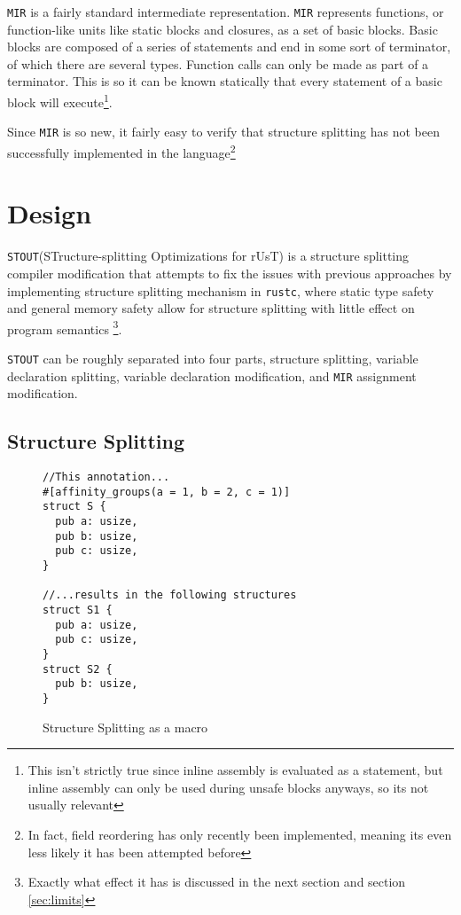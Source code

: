 \documentclass[12pt,oneside]{book}
\newcommand{\rustcname}{{\texttt{rustc}}}
\def \rustc {\rustcname{}\xspace}
\newcommand{\mirname}{{\texttt{MIR}}}
\def \mir {\mirname{}\xspace}
\newcommand{\projectname}{{\texttt{STOUT}}}
\def \name{\projectname\xspace}
\begin{document}
\mir is a fairly standard intermediate representation. \mir represents functions, 
or function-like units like static blocks and closures, 
as a set of basic blocks. Basic blocks are composed of a series of statements
and end in some sort of terminator, of which there are several types. 
Function calls can only be made as part of a terminator. This is
so it can be known statically that every statement of a basic block will
execute\footnote{This isn't strictly true since inline assembly is evaluated as
  a statement, but inline assembly can only be used during unsafe blocks
  anyways, so its not usually relevant}.

  Since \mir is so new, it fairly easy to verify that structure splitting has
  not been successfully implemented in the language\footnote{In fact, field
  reordering has only recently been implemented, meaning its even less
  likely it has been attempted before}

\chapter{Design}

\name (STructure-splitting Optimizations for rUsT) is a structure 
splitting compiler modification that attempts to fix the issues with
previous approaches by implementing structure splitting 
mechanism in \rustc, where static type
safety and general memory safety allow for 
structure splitting with little effect on program
semantics
\footnote{Exactly what effect it has is discussed in the next section and section \ref{sec:limits}}.

\name can be roughly separated into 
four parts, 
structure splitting, 
variable declaration splitting,
variable declaration modification,
and 
\mir assignment modification.

\section{Structure Splitting}

\begin{figure*}
\begin{verbatim}
//This annotation...
#[affinity_groups(a = 1, b = 2, c = 1)]
struct S {
  pub a: usize,
  pub b: usize,
  pub c: usize,
}

//...results in the following structures
struct S1 {
  pub a: usize,
  pub c: usize,
}
struct S2 {
  pub b: usize,
}
\end{verbatim}
  \caption{Structure Splitting as a macro}
  \label{fig:split}
\end{figure*}
\end{document}
